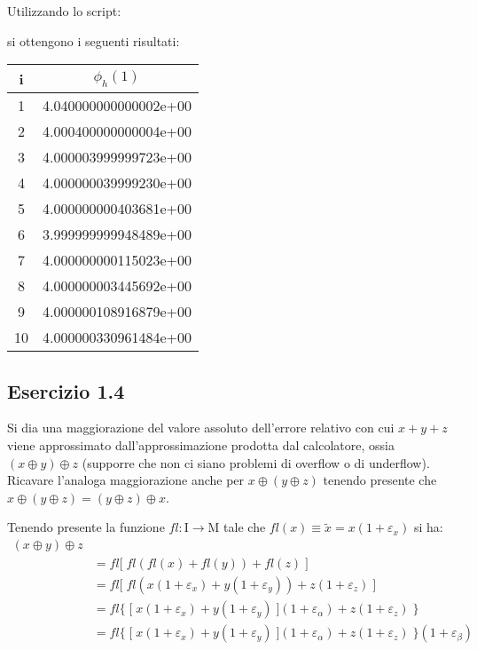 Utilizzando lo script:

si ottengono i seguenti risultati:
\begin{tabular}{ c | c }
i & $\phi_h(1)$ \\
\hline
1  & 4.040000000000002e+00 \\
2  & 4.000400000000004e+00 \\
3  & 4.000003999999723e+00 \\
4  & 4.000000039999230e+00 \\
5  & 4.000000000403681e+00 \\
6  & 3.999999999948489e+00 \\
7  & 4.000000000115023e+00 \\
8  & 4.000000003445692e+00 \\
9  & 4.000000108916879e+00 \\
10 & 4.000000330961484e+00 \\
\end{tabular}

	\subsection{Esercizio 1.4}
	
Si dia una maggiorazione del valore assoluto dell’errore relativo con cui $x + y + z$ viene approssimato dall’approssimazione prodotta dal calcolatore, ossia $(x \oplus y) \oplus z$ (supporre che non ci siano problemi di overflow o di underflow). Ricavare l’analoga maggiorazione anche per $x \oplus (y \oplus z)$ tenendo presente che $x \oplus (y \oplus z) = (y \oplus z) \oplus x$.

\TODO

Tenendo presente la funzione $fl: \mathrm{I} \rightarrow \mathrm{M}$ tale che $fl(x) \equiv \tilde{x} = x(1+\varepsilon_x)$ si ha:
\begin{equation*}
	\begin{split}
		(x \oplus y) \oplus z \\
		& = fl \lbrack \; fl(fl(x) + fl(y)) + fl(z) \;\rbrack \\
		& = fl \lbrack \; fl(x(1+\varepsilon_x) + y(1+\varepsilon_y)) + z(1+\varepsilon_z) \; \rbrack \\
		& = fl \{ \; \lbrack \; x(1+\varepsilon_x) + y(1+\varepsilon_y) \; \rbrack (1 + \varepsilon_{\alpha}) + z(1+\varepsilon_z) \; \} \\
  		& = fl \{ \; \lbrack \; x(1+\varepsilon_x) + y(1+\varepsilon_y) \; \rbrack (1 + \varepsilon_{\alpha}) + z(1+\varepsilon_z) \; \} (1 + \varepsilon_{\beta})
	\end{split}
\end{equation*}


